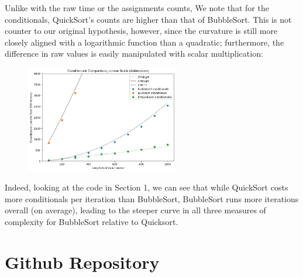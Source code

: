 \documentclass{article}
\begin{document}
Unlike with the raw time or the assignments counts, We note that for the conditionals, QuickSort's counts are higher than that of BubbleSort. This is not counter to our original hypothesis, however, since the curvature is still more closely aligned with a logarithmic function than a quadratic; furthermore, the difference in raw values is easily manipulated with scalar multiplication: \par
\begin{figure}[h!]
\centering
\includegraphics[width=0.6\textwidth]{hw1/fig5.png}
\end{figure}
Indeed, looking at the code in Section 1, we can see that while QuickSort costs more conditionals per iteration than BubbleSort, BubbleSort runs more iterations overall (on average), leading to the steeper curve in all three measures of complexity for BubbleSort relative to Quicksort. \par

\section{Github Repository}
\end{document}
